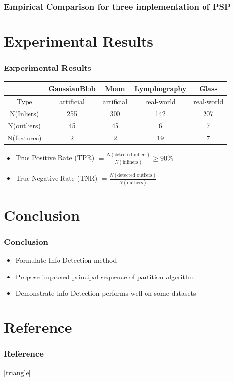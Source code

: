 \documentclass[notheorems]{beamer}
\begin{document}
\begin{frame}
	\frametitle{Empirical Comparison for three implementation of PSP}
\end{frame}
\section{Experimental Results}
\begin{frame}
	\frametitle{Experimental Results}
\begin{table}
\centering
\begin{tabular}{ccccc}
\hline
              &  GaussianBlob   &      Moon       &  Lymphography  &     Glass     \\
\hline
   Type    & artificial & artificial & real-world & real-world \\
   N(Inliers) & 255  & 300 & 142  & 207 \\
   N(outliers)   & 45 &  45  & 6 & 7 \\
   N(features)   & 2 &  2  & 19 & 7  \\
\hline
\end{tabular}
\end{table}
\begin{itemize}
\item True Positive Rate (TPR)  $=\frac{N(\textrm{detected inliers})}{N(\textrm{inliners})} \geq 90\% $
\item True Negative Rate (TNR) $=\frac{N(\textrm{detected outliers})}{N(\textrm{outliers})}$
\end{itemize}
\begin{table}
\centering
{\scriptsize

}
\end{table}

\end{frame}	
\section{Conclusion}
\begin{frame}
\frametitle{Conclusion}
\begin{itemize}
\item Formulate Info-Detection method
\item Propose improved principal sequence of partition algorithm 
\item Demonstrate Info-Detection performs well on some datasets
\end{itemize}
\end{frame}
\section*{Reference}
\begin{frame}
\frametitle{Reference}
[triangle]

{\scriptsize

}
\end{frame}
\end{document}
